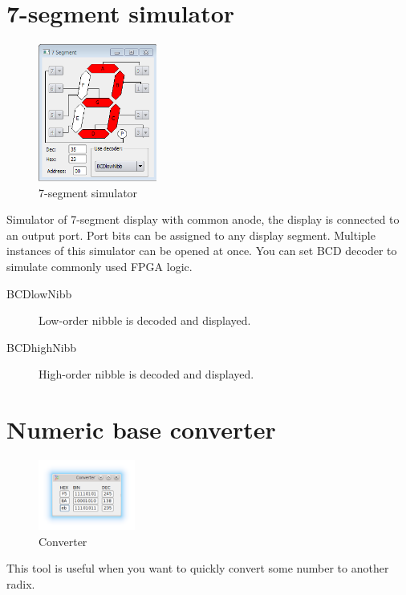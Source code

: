 \section{7-segment simulator}
    \begin{figure}
        \centering{}
        \includegraphics[width=110pt]{img/7seg_sim.png}
        \caption{7-segment simulator}
    \end{figure}
    Simulator of 7-segment display with common anode, the display is connected to an output port. Port bits can be
    assigned to any display segment. Multiple instances of this simulator can be opened at once. You can set BCD decoder
    to simulate commonly used FPGA logic.

    \begin{description}
        \item[BCDlowNibb] Low-order nibble is decoded and displayed.
        \item[BCDhighNibb] High-order nibble is decoded and displayed.
    \end{description}

\section{Numeric base converter}
    \begin{figure}
            \centering
            \includegraphics[width=90pt]{img/converter.png}
            \caption{Converter}
    \end{figure}
    This tool is useful when you want to quickly convert some number to another radix.
